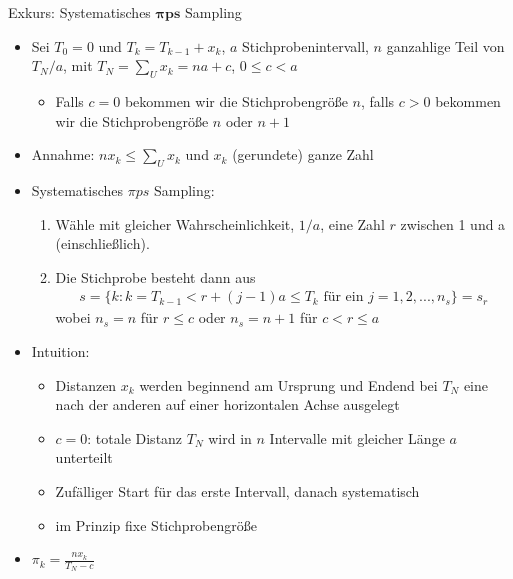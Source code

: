 \documentclass[9pt]{beamer}
\begin{document}
\begin{frame}{Exkurs: Systematisches $\boldsymbol{\pi ps}$ Sampling}
\begin{itemize}
	\item Sei $T_0 = 0$ und $T_k = T_{k-1}+x_k$, $a$ Stichprobenintervall, $n$ ganzahlige Teil von $T_N/a$, mit $T_N = \sum_U x_k=na+c$, $0 \leq c < a$
	\begin{itemize}
	\item Falls $c=0$ bekommen wir die Stichprobengröße $n$, falls $c>0$ bekommen wir die Stichprobengröße $n$ oder $n+1$
	\end{itemize}
	\item Annahme: $n x_k \leq \sum_U x_k$ und $x_k$ (gerundete) ganze Zahl
	\item Systematisches $\pi ps$ Sampling:
	\begin{enumerate}
		\item Wähle mit gleicher Wahrscheinlichkeit, $1/a$, eine Zahl $r$ zwischen 1 und a (einschließlich).
		\item Die Stichprobe besteht dann aus
		\begin{align*}
		s = \{k:k=T_{k-1} <r+(j-1)a\leq T_k \text{ für ein } j=1,2,...,n_s\} = s_r
		\end{align*}
		wobei $n_s = n$ für $r \leq c$ oder $n_s = n+1$ für $c < r \leq a$
	\end{enumerate}
	\item Intuition:
	\begin{itemize}
		\item Distanzen $x_k$ werden beginnend am Ursprung und Endend bei $T_N$ eine nach der anderen auf einer horizontalen Achse ausgelegt
		\item $c=0$: totale Distanz $T_N$ wird in $n$ Intervalle mit gleicher Länge $a$ unterteilt 
		\item Zufälliger Start für das erste Intervall, danach systematisch
		\item im Prinzip fixe Stichprobengröße		
	\end{itemize} 
\item $\pi_k = \frac{n x_k}{T_N -c}$
\end{itemize}
\end{frame}
\end{document}
